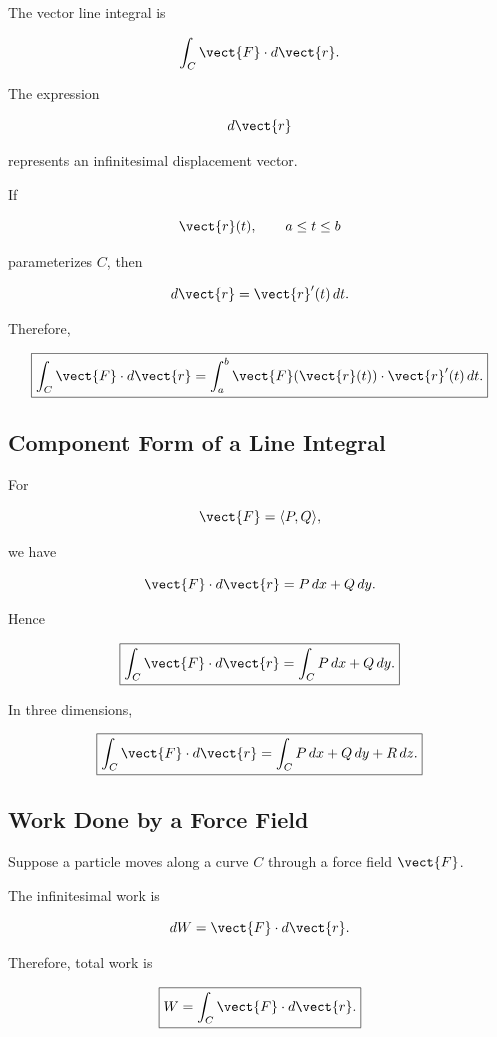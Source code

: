 The vector line integral is

\[ \int_C\vect{F}\cdot d\vect{r}. \]

The expression

\[ d\vect{r} \]

represents an infinitesimal displacement vector.

If

\[ \vect{r}(t),\qquad a\leq t\leq b \]

parameterizes \(C\), then

\[ d\vect{r}=\vect{r}'(t)\,dt. \]

Therefore,

\[ \boxed{\int_C\vect{F}\cdot d\vect{r}
=\int_a^b\vect{F}(\vect{r}(t))\cdot\vect{r}'(t)\,dt.} \]

\subsection{Component Form of a Line Integral}
\label{subsec:component-line-integral}

For

\[ \vect{F}=\langle P,Q\rangle, \]

we have

\[ \vect{F}\cdot d\vect{r}=P\,dx+Q\,dy. \]

Hence

\[ \boxed{\int_C\vect{F}\cdot d\vect{r}
=\int_C P\,dx+Q\,dy.} \]

In three dimensions,

\[ \boxed{\int_C\vect{F}\cdot d\vect{r}
=\int_C P\,dx+Q\,dy+R\,dz.} \]

\subsection{Work Done by a Force Field}
\label{subsec:work-force-field}

Suppose a particle moves along a curve \(C\) through a force field
\(\vect{F}\).

The infinitesimal work is

\[ dW=\vect{F}\cdot d\vect{r}. \]

Therefore, total work is

\[ \boxed{W=\int_C\vect{F}\cdot d\vect{r}.} \]

